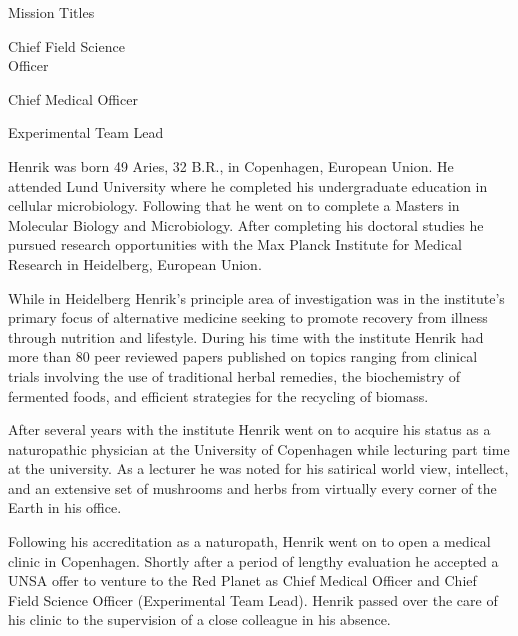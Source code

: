 {        \bTR
            \bTC Mission Titles \eTC
            \bTC 
                \startitemize[4]
                \startpacked
                \item Chief Field Science\\Officer
                \item Chief Medical Officer
                \item Experimental Team Lead
                \stoppacked
                \stopitemize
            \eTC
        \eTR
    \eTABLEbody

\eTABLE
}

Henrik was born 49 Aries, 32 B.R., in Copenhagen, European Union. He attended Lund University where he completed his undergraduate education in cellular microbiology. Following that he went on to complete a Masters in Molecular Biology and Microbiology. After completing his doctoral studies he pursued research opportunities with the Max Planck Institute for Medical Research in Heidelberg, European Union.

While in Heidelberg Henrik's principle area of investigation was in the institute's primary focus of alternative medicine seeking to promote recovery from illness through nutrition and lifestyle. During his time with the institute Henrik had more than 80 peer reviewed papers published on topics ranging from clinical trials involving the use of traditional herbal remedies, the biochemistry of fermented foods, and efficient strategies for the recycling of biomass.

After several years with the institute Henrik went on to acquire his status as a naturopathic physician at the University of Copenhagen while lecturing part time at the university. As a lecturer he was noted for his satirical world view, intellect, and an extensive set of mushrooms and herbs from virtually every corner of the Earth in his office.

Following his accreditation as a naturopath, Henrik went on to open a medical clinic in Copenhagen. Shortly after a period of lengthy evaluation he accepted a UNSA offer to venture to the Red Planet as Chief Medical Officer and Chief Field Science Officer (Experimental Team Lead). Henrik passed over the care of his clinic to the supervision of a close colleague in his absence.

